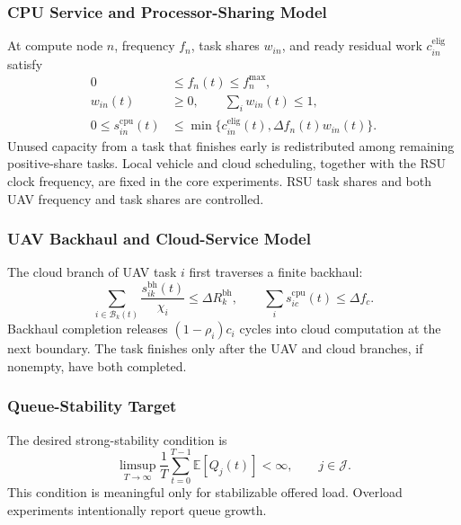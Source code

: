 \subsubsection{CPU Service and Processor-Sharing Model}
At compute node $n$, frequency $f_n$, task shares $w_{in}$, and ready
residual work $c_{in}^{\mathrm{elig}}$ satisfy
\begin{equation}
\begin{aligned}
0&\le f_n(t)\le f_n^{\max},\\
w_{in}(t)&\ge0,\qquad \sum_iw_{in}(t)\le1,\\
0\le s_{in}^{\mathrm{cpu}}(t)&\le
\min\{c_{in}^{\mathrm{elig}}(t),\Delta f_n(t)w_{in}(t)\}.
\end{aligned}
\label{eq:cpu_capacity}
\end{equation}
Unused capacity from a task that finishes early is redistributed among
remaining positive-share tasks. Local vehicle and cloud scheduling,
together with the RSU clock frequency, are fixed in the core experiments.
RSU task shares and both UAV frequency and task shares are controlled.

\subsubsection{UAV Backhaul and Cloud-Service Model}
The cloud branch of UAV task $i$ first traverses a finite backhaul:
\begin{equation}
\sum_{i\in\mathcal B_k(t)}
\frac{s_{ik}^{\mathrm{bh}}(t)}{\chi_i}
\le\Delta R_k^{\mathrm{bh}},
\qquad
\sum_i s_{ic}^{\mathrm{cpu}}(t)\le\Delta f_c.
\label{eq:cloud_capacity}
\end{equation}
Backhaul completion releases $(1-\rho_i)c_i$ cycles into cloud
computation at the next boundary. The task finishes only after the UAV
and cloud branches, if nonempty, have both completed.

\subsubsection{Queue-Stability Target}
The desired strong-stability condition is
\begin{equation}
\limsup_{T\to\infty}\frac1T\sum_{t=0}^{T-1}
\mathbb E[Q_j(t)]<\infty,\qquad j\in\mathcal J.
\label{eq:stability}
\end{equation}
This condition is meaningful only for stabilizable offered load.
Overload experiments intentionally report queue growth.

